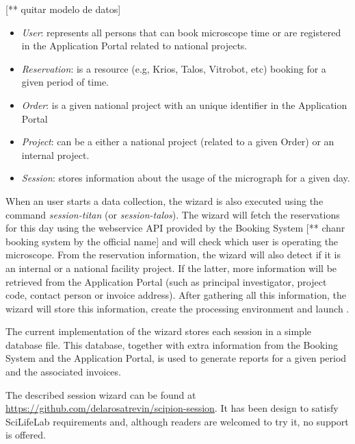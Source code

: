 [** quitar modelo de datos]
\begin{itemize}
\setlength\itemsep{0em}
 \item \textit{User}: represents all persons that can book microscope time or are registered in the Application Portal 
 related to national projects.
 \item \textit{Reservation}:  is a resource (e.g, Krios, Talos, Vitrobot, etc) booking for a given period of time.
 \item \textit{Order}:  is a given national project with an unique identifier in the Application Portal
 \item \textit{Project}:  can be a either a national project (related to a given Order) or an internal project.
 \item \textit{Session}:  stores information about the usage of the micrograph for a given day.
\end{itemize}

When an user starts a data collection, the wizard is also executed using the command \textit{session-titan} (or \textit{session-talos}). The wizard will fetch the reservations for this day using the webservice API provided by the Booking System [** chanr booking system by the official name] and will check which user is operating the microscope. From the reservation information, the wizard will also detect if it is an internal or a national facility project. If the latter, more information will be retrieved from the Application Portal (such as principal investigator, project code, contact person or invoice address). After gathering all this information, the wizard will store this information, create the processing environment and launch \scipion. %

The current implementation of the wizard stores each session in a simple database file. This database, together with extra information from the Booking System and the Application Portal, is used to generate reports for a given period and the associated invoices. %

The described session wizard can be found at  \url{https://github.com/delarosatrevin/scipion-session}. It has been design to satisfy SciLifeLab requirements and, although readers are welcomed to try it, no support is offered.



